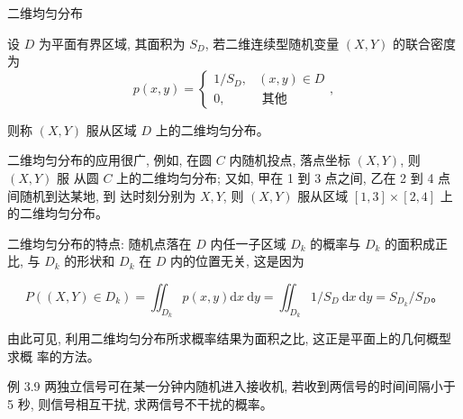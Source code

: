 \documentclass{beamer}
\begin{document}
	\begin{frame}
	    二维均匀分布
		
		设 $D$ 为平面有界区域, 其面积为 $S_{D}$, 若二维连续型随机变量 $(X, Y)$ 的联合密度为
		$$
		p(x, y)=\left\{\begin{array}{cc}
			1 / S_{D}, & (x, y) \in D \\
			0, & \text { 其他 }
		\end{array},\right.
		$$
		
		则称 $(X, Y)$ 服从区域 $D$ 上的二维均匀分布。
		
		二维均匀分布的应用很广, 例如, 在圆 $C$ 内随机投点, 落点坐标 $(X, Y)$, 则 $(X, Y)$ 服 从圆 $C$ 上的二维均匀分布; 又如, 甲在 1 到 3 点之间, 乙在 2 到 4 点间随机到达某地, 到 达时刻分别为 $X, Y$, 则 $(X, Y)$ 服从区域 $[1,3] \times[2,4]$ 上的二维均匀分布。
		
		二维均匀分布的特点: 随机点落在 $D$ 内任一子区域 $D_{k}$ 的概率与 $D_{k}$ 的面积成正比, 与 $D_{k}$ 的形状和 $D_{k}$ 在 $D$ 内的位置无关, 这是因为
		
		$$
		P\left((X, Y) \in D_{k}\right)=\iint_{D_{k}} p(x, y) \mathrm{d} x \mathrm{~d} y=\iint_{D_{k}} 1 / S_{D} \mathrm{~d} x \mathrm{~d} y=S_{D_{k}} / S_{D} 。
		$$
		
		由此可见, 利用二维均匀分布所求概率结果为面积之比, 这正是平面上的几何概型求概 率的方法。
	\end{frame}
	
	\begin{frame}
		例 3.9 两独立信号可在某一分钟内随机进入接收机, 若收到两信号的时间间隔小于 5 秒, 则信号相互干扰, 求两信号不干扰的概率。
	\end{frame}
	
\end{document}

